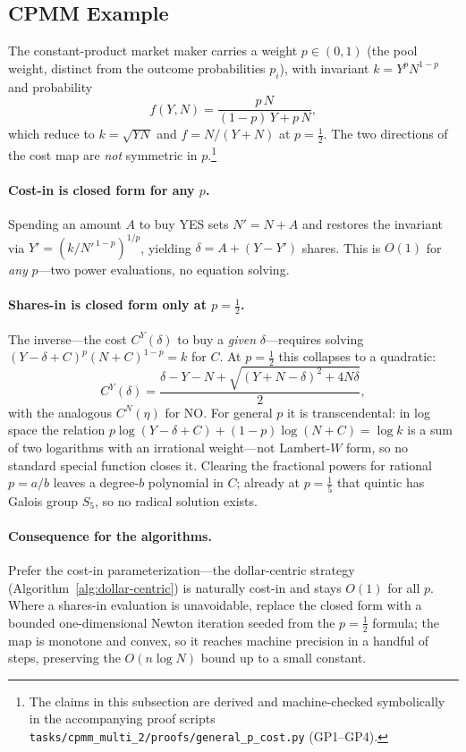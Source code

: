 \documentclass[11pt]{article}
\begin{document}
\subsection{CPMM Example}
\label{sec:cpmm-example}

The constant-product market maker carries a weight $p \in (0,1)$ (the pool weight, distinct from the outcome probabilities $p_i$), with invariant $k = Y^p N^{1-p}$ and probability
\begin{equation}
f(Y, N) = \frac{p\,N}{(1-p)\,Y + p\,N},
\end{equation}
which reduce to $k = \sqrt{YN}$ and $f = N/(Y+N)$ at $p = \tfrac12$. The two directions of the cost map are \emph{not} symmetric in $p$.\footnote{The claims in this subsection are derived and machine-checked symbolically in the accompanying proof scripts \texttt{tasks/cpmm\_multi\_2/proofs/general\_p\_cost.py} (GP1--GP4).}

\paragraph{Cost-in is closed form for any $p$.} Spending an amount $A$ to buy YES sets $N' = N + A$ and restores the invariant via $Y' = (k / N'^{\,1-p})^{1/p}$, yielding $\delta = A + (Y - Y')$ shares. This is $O(1)$ for \emph{any} $p$---two power evaluations, no equation solving.

\paragraph{Shares-in is closed form only at $p = \tfrac12$.} The inverse---the cost $C^Y(\delta)$ to buy a \emph{given} $\delta$---requires solving $(Y - \delta + C)^p (N + C)^{1-p} = k$ for $C$. At $p = \tfrac12$ this collapses to a quadratic:
\begin{equation}
C^Y(\delta) = \frac{\delta - Y - N + \sqrt{(Y + N - \delta)^2 + 4N\delta}}{2},
\end{equation}
with the analogous $C^N(\eta)$ for NO. For general $p$ it is transcendental: in log space the relation $p \log(Y - \delta + C) + (1-p)\log(N + C) = \log k$ is a sum of two logarithms with an irrational weight---not Lambert-$W$ form, so no standard special function closes it. Clearing the fractional powers for rational $p = a/b$ leaves a degree-$b$ polynomial in $C$; already at $p = \tfrac15$ that quintic has Galois group $S_5$, so no radical solution exists.

\paragraph{Consequence for the algorithms.} Prefer the cost-in parameterization---the dollar-centric strategy (Algorithm~\ref{alg:dollar-centric}) is naturally cost-in and stays $O(1)$ for all $p$. Where a shares-in evaluation is unavoidable, replace the closed form with a bounded one-dimensional Newton iteration seeded from the $p = \tfrac12$ formula; the map is monotone and convex, so it reaches machine precision in a handful of steps, preserving the $O(n \log N)$ bound up to a small constant.
\end{document}

